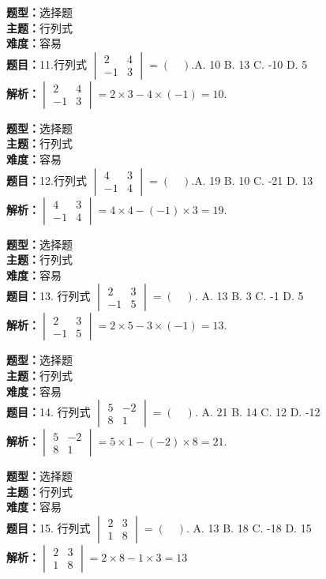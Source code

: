 \documentclass{ctexart}
\newenvironment{question}[5]{%
	\noindent\textbf{题型：}#1\\
	\textbf{主题：}#2\\
	\textbf{难度：}#3\\
	\textbf{题目：}#4\\
	\textbf{解析：}#5\\
	\vspace{1em}
}{}
\begin{document}
	\begin{question}
		{选择题}
		{行列式}
		{容易}
		{11.行列式 \(\begin{vmatrix} 2 & 4 \\ -1 & 3\end{vmatrix}=(\quad). \)A. 10 \quad B. 13 \quad C. -10 \quad D. 5}
		{\(\begin{vmatrix} 2 & 4 \\ -1 & 3\end{vmatrix}=2 \times 3-4 \times(-1)=10.\)}
	\end{question}
	
	\begin{question}
		{选择题}
		{行列式}
		{容易}
		{12.行列式 \(\begin{vmatrix} 4 & 3 \\ -1 & 4\end{vmatrix}=(\quad). \)A. 19 \quad B. 10 \quad C. -21 \quad D. 13}
		{\(\begin{vmatrix} 4 & 3 \\ -1 & 4\end{vmatrix}=4 \times 4-(-1) \times 3=19. \)}
	\end{question}
	
	\begin{question}
		{选择题}
		{行列式}
		{容易}
		{13. 行列式 \(\begin{vmatrix} 2 & 3 \\ -1 & 5\end{vmatrix}=(\quad). \)
			A. 13 \quad B. 3 \quad C. -1 \quad D. 5}
		{\(\begin{vmatrix} 2 & 3 \\ -1 & 5\end{vmatrix}=2 \times 5-3 \times(-1)=13. \)}
	\end{question}
	
	
	\begin{question}
		{选择题}
		{行列式}
		{容易}
		{14. 行列式 \(\begin{vmatrix} 5 & -2 \\ 8 & 1\end{vmatrix}=(\quad). \) A.  21 \quad B.  14 \quad C.  12 \quad D. -12}
		{\(\begin{vmatrix} 5 & -2 \\ 8 & 1\end{vmatrix}=5 \times 1-(-2) \times 8=21. \)}
	\end{question}
	
	\begin{question}
		{选择题}
		{行列式}
		{容易}
		{15. 行列式 \(\begin{vmatrix} 2 & 3 \\ 1 & 8\end{vmatrix}=(\quad). \) A.  13 \quad B.  18 \quad C. -18 \quad D.  15}
		{\(\begin{vmatrix} 2 & 3 \\ 1 & 8\end{vmatrix}=2 \times 8-1 \times 3=13\)}
	\end{question}
	
\end{document}
